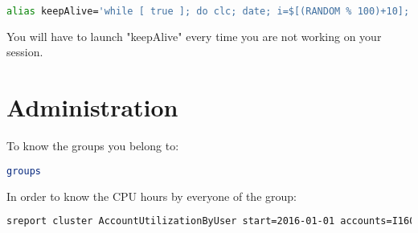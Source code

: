 \begin{lstlisting}[language=bash]
alias keepAlive='while [ true ]; do clc; date; i=$[(RANDOM % 100)+10]; sleep $i; done'
\end{lstlisting}

You will have to launch "keepAlive" every time you are not working on your session.

\section{Administration}

To know the groups you belong to:
\begin{lstlisting}[language=bash]
groups
\end{lstlisting}

In order to know the CPU hours by everyone of the group:
\begin{lstlisting}[language=bash]
sreport cluster AccountUtilizationByUser start=2016-01-01 accounts=I1608251 -t hours
\end{lstlisting}

